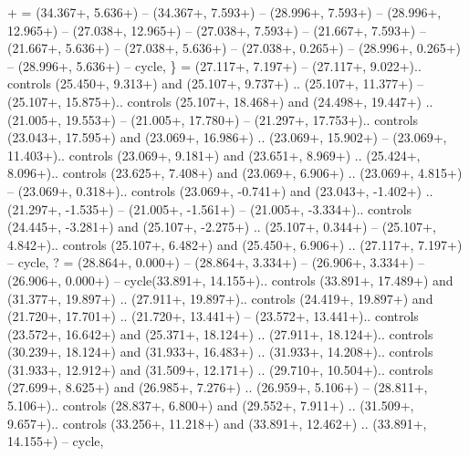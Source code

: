 {+} = {(34.367+\ctpXshift, 5.636+\ctpYshift) -- (34.367+\ctpXshift, 7.593+\ctpYshift) -- (28.996+\ctpXshift, 7.593+\ctpYshift) -- (28.996+\ctpXshift, 12.965+\ctpYshift) -- (27.038+\ctpXshift, 12.965+\ctpYshift) -- (27.038+\ctpXshift, 7.593+\ctpYshift) -- (21.667+\ctpXshift, 7.593+\ctpYshift) -- (21.667+\ctpXshift, 5.636+\ctpYshift) -- (27.038+\ctpXshift, 5.636+\ctpYshift) -- (27.038+\ctpXshift, 0.265+\ctpYshift) -- (28.996+\ctpXshift, 0.265+\ctpYshift) -- (28.996+\ctpXshift, 5.636+\ctpYshift) -- cycle},
{\}} = {(27.117+\ctpXshift, 7.197+\ctpYshift) -- (27.117+\ctpXshift, 9.022+\ctpYshift).. controls (25.450+\ctpXshift, 9.313+\ctpYshift) and (25.107+\ctpXshift, 9.737+\ctpYshift) .. (25.107+\ctpXshift, 11.377+\ctpYshift) -- (25.107+\ctpXshift, 15.875+\ctpYshift).. controls (25.107+\ctpXshift, 18.468+\ctpYshift) and (24.498+\ctpXshift, 19.447+\ctpYshift) .. (21.005+\ctpXshift, 19.553+\ctpYshift) -- (21.005+\ctpXshift, 17.780+\ctpYshift) -- (21.297+\ctpXshift, 17.753+\ctpYshift).. controls (23.043+\ctpXshift, 17.595+\ctpYshift) and (23.069+\ctpXshift, 16.986+\ctpYshift) .. (23.069+\ctpXshift, 15.902+\ctpYshift) -- (23.069+\ctpXshift, 11.403+\ctpYshift).. controls (23.069+\ctpXshift, 9.181+\ctpYshift) and (23.651+\ctpXshift, 8.969+\ctpYshift) .. (25.424+\ctpXshift, 8.096+\ctpYshift).. controls (23.625+\ctpXshift, 7.408+\ctpYshift) and (23.069+\ctpXshift, 6.906+\ctpYshift) .. (23.069+\ctpXshift, 4.815+\ctpYshift) -- (23.069+\ctpXshift, 0.318+\ctpYshift).. controls (23.069+\ctpXshift, -0.741+\ctpYshift) and (23.043+\ctpXshift, -1.402+\ctpYshift) .. (21.297+\ctpXshift, -1.535+\ctpYshift) -- (21.005+\ctpXshift, -1.561+\ctpYshift) -- (21.005+\ctpXshift, -3.334+\ctpYshift).. controls (24.445+\ctpXshift, -3.281+\ctpYshift) and (25.107+\ctpXshift, -2.275+\ctpYshift) .. (25.107+\ctpXshift, 0.344+\ctpYshift) -- (25.107+\ctpXshift, 4.842+\ctpYshift).. controls (25.107+\ctpXshift, 6.482+\ctpYshift) and (25.450+\ctpXshift, 6.906+\ctpYshift) .. (27.117+\ctpXshift, 7.197+\ctpYshift) -- cycle},
{?} = {(28.864+\ctpXshift, 0.000+\ctpYshift) -- (28.864+\ctpXshift, 3.334+\ctpYshift) -- (26.906+\ctpXshift, 3.334+\ctpYshift) -- (26.906+\ctpXshift, 0.000+\ctpYshift) -- cycle(33.891+\ctpXshift, 14.155+\ctpYshift).. controls (33.891+\ctpXshift, 17.489+\ctpYshift) and (31.377+\ctpXshift, 19.897+\ctpYshift) .. (27.911+\ctpXshift, 19.897+\ctpYshift).. controls (24.419+\ctpXshift, 19.897+\ctpYshift) and (21.720+\ctpXshift, 17.701+\ctpYshift) .. (21.720+\ctpXshift, 13.441+\ctpYshift) -- (23.572+\ctpXshift, 13.441+\ctpYshift).. controls (23.572+\ctpXshift, 16.642+\ctpYshift) and (25.371+\ctpXshift, 18.124+\ctpYshift) .. (27.911+\ctpXshift, 18.124+\ctpYshift).. controls (30.239+\ctpXshift, 18.124+\ctpYshift) and (31.933+\ctpXshift, 16.483+\ctpYshift) .. (31.933+\ctpXshift, 14.208+\ctpYshift).. controls (31.933+\ctpXshift, 12.912+\ctpYshift) and (31.509+\ctpXshift, 12.171+\ctpYshift) .. (29.710+\ctpXshift, 10.504+\ctpYshift).. controls (27.699+\ctpXshift, 8.625+\ctpYshift) and (26.985+\ctpXshift, 7.276+\ctpYshift) .. (26.959+\ctpXshift, 5.106+\ctpYshift) -- (28.811+\ctpXshift, 5.106+\ctpYshift).. controls (28.837+\ctpXshift, 6.800+\ctpYshift) and (29.552+\ctpXshift, 7.911+\ctpYshift) .. (31.509+\ctpXshift, 9.657+\ctpYshift).. controls (33.256+\ctpXshift, 11.218+\ctpYshift) and (33.891+\ctpXshift, 12.462+\ctpYshift) .. (33.891+\ctpXshift, 14.155+\ctpYshift) -- cycle},
